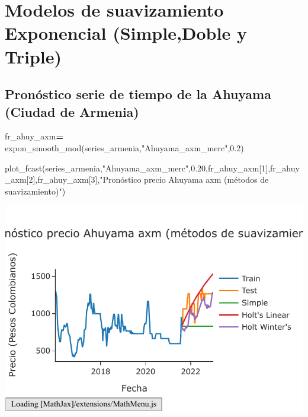 \documentclass[
]{book}
\newenvironment{Shaded}{\begin{snugshade}}{\end{snugshade}}
\newcommand{\DecValTok}[1]{\textcolor[rgb]{0.00,0.00,0.81}{#1}}
\newcommand{\FloatTok}[1]{\textcolor[rgb]{0.00,0.00,0.81}{#1}}
\newcommand{\NormalTok}[1]{#1}
\newcommand{\OperatorTok}[1]{\textcolor[rgb]{0.81,0.36,0.00}{\textbf{#1}}}
\newcommand{\StringTok}[1]{\textcolor[rgb]{0.31,0.60,0.02}{#1}}
\begin{document}
\hypertarget{modelos-de-suavizamiento-exponencial-simpledoble-y-triple}{%
\section{Modelos de suavizamiento Exponencial (Simple,Doble y Triple)}\label{modelos-de-suavizamiento-exponencial-simpledoble-y-triple}}

\hypertarget{pronuxf3stico-serie-de-tiempo-de-la-ahuyama-ciudad-de-armenia}{%
\subsection{Pronóstico serie de tiempo de la Ahuyama (Ciudad de Armenia)}\label{pronuxf3stico-serie-de-tiempo-de-la-ahuyama-ciudad-de-armenia}}

\begin{Shaded}
\begin{Highlighting}[]

\NormalTok{fr\_ahuy\_axm}\OperatorTok{=}\NormalTok{ expon\_smooth\_mod(series\_armenia,}\StringTok{"Ahuyama\_axm\_merc"}\NormalTok{,}\FloatTok{0.2}\NormalTok{)}

\NormalTok{plot\_fcast(series\_armenia,}\StringTok{"Ahuyama\_axm\_merc"}\NormalTok{,}\FloatTok{0.20}\NormalTok{,fr\_ahuy\_axm[}\DecValTok{1}\NormalTok{],fr\_ahuy\_axm[}\DecValTok{2}\NormalTok{],fr\_ahuy\_axm[}\DecValTok{3}\NormalTok{],}\StringTok{"Pronóstico precio Ahuyama axm (métodos de suavizamiento)"}\NormalTok{)}
\end{Highlighting}
\end{Shaded}

\includegraphics{bookdown-demo_files/figure-latex/unnamed-chunk-132-119.pdf}
\end{document}
